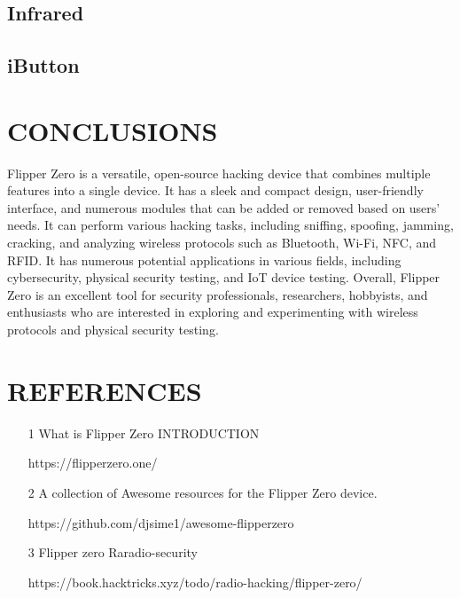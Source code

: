 \documentclass[a4paper,11pt]{report}
\begin{document}
\section{Infrared}
\section{iButton}
\chapter{CONCLUSIONS}
Flipper Zero is a versatile, open-source hacking device that combines multiple features into a single device. It has a sleek and compact design, user-friendly interface, and numerous modules that can be added or removed based on users' needs. It can perform various hacking tasks, including sniffing, spoofing, jamming, cracking, and analyzing wireless protocols such as Bluetooth, Wi-Fi, NFC, and RFID. It has numerous potential applications in various fields, including cybersecurity, physical security testing, and IoT device testing. Overall, Flipper Zero is an excellent tool for security professionals, researchers, hobbyists, and enthusiasts who are interested in exploring and experimenting with wireless protocols and physical security testing.
\chapter{REFERENCES}
\begin{itemize}
\item [1] What is Flipper Zero INTRODUCTION  
                                                                     
https://flipperzero.one/
\item[2] A collection of Awesome resources for the Flipper Zero device.

https://github.com/djsime1/awesome-flipperzero
\item[3] Flipper zero Raradio-security

https://book.hacktricks.xyz/todo/radio-hacking/flipper-zero/
\vspace{12pt}
\end{itemize}
\end{document}
